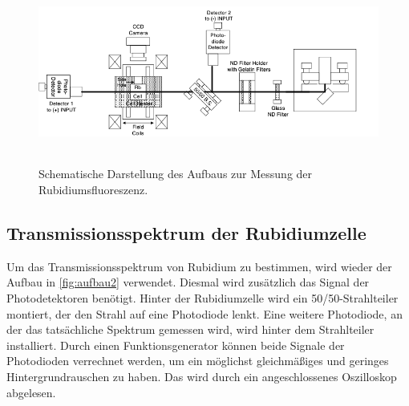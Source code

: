 \begin{figure}
    \centering
    \includegraphics[height=6cm]{content/pics/aufbau.png}
    \caption{Schematische Darstellung des Aufbaus zur Messung der Rubidiumsfluoreszenz. \cite{V60}}
    \label{fig:aufbau2}
\end{figure}

\subsection{Transmissionsspektrum der Rubidiumzelle}
\label{sec:Transmissionsspektrum}
Um das Transmissionsspektrum von Rubidium zu bestimmen, wird wieder der Aufbau in \autoref{fig:aufbau2} verwendet.
Diesmal wird zusätzlich das Signal der Photodetektoren benötigt. Hinter der Rubidiumzelle wird ein 
50/50-Strahlteiler montiert, der den Strahl auf eine Photodiode lenkt. Eine weitere Photodiode, an der das
tatsächliche Spektrum gemessen wird, wird hinter dem Strahlteiler installiert. Durch einen Funktionsgenerator können
beide Signale der Photodioden verrechnet werden, um ein möglichst gleichmäßiges und geringes Hintergrundrauschen
zu haben. Das wird durch ein angeschlossenes Oszilloskop abgelesen.